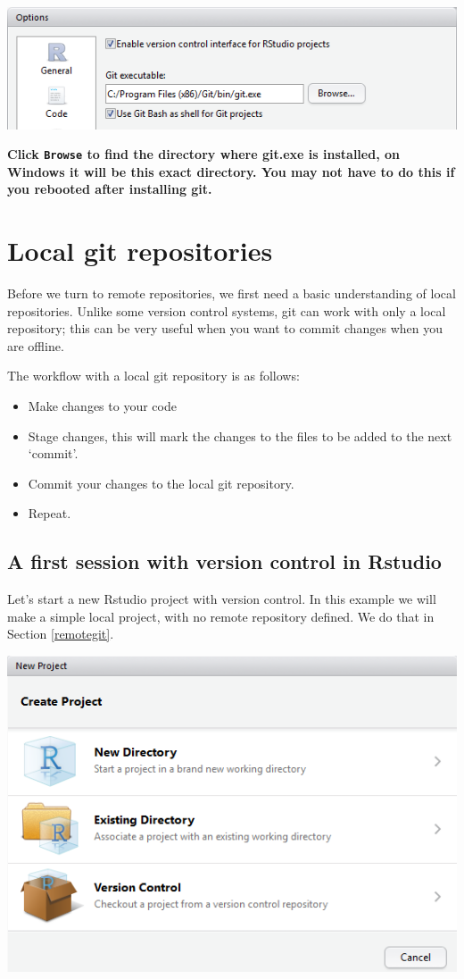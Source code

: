 \documentclass[]{book}
\providecommand{\tightlist}{%
  \setlength{\itemsep}{0pt}\setlength{\parskip}{0pt}}
\begin{document}
\includegraphics[width=0.75\linewidth]{screenshots/gitoptionsrstudio}

\textbf{Click \texttt{Browse} to find the directory where git.exe is installed, on Windows it will be this exact directory. You may not have to do this if you rebooted after installing git.}

\hypertarget{localgit}{%
\section{Local git repositories}\label{localgit}}

Before we turn to remote repositories, we first need a basic understanding of local repositories. Unlike some version control systems, git can work with only a local repository; this can be very useful when you want to commit changes when you are offline.

The workflow with a local git repository is as follows:

\begin{itemize}
\tightlist
\item
  Make changes to your code
\item
  Stage changes, this will mark the changes to the files to be added to the next `commit'.
\item
  Commit your changes to the local git repository.
\item
  Repeat.
\end{itemize}

\hypertarget{firstgitsession}{%
\subsection{A first session with version control in Rstudio}\label{firstgitsession}}

Let's start a new Rstudio project with version control. In this example we will make a simple local project, with no remote repository defined. We do that in Section \ref{remotegit}.

\includegraphics[width=0.75\linewidth]{screenshots/versioncontrolproject}
\end{document}
